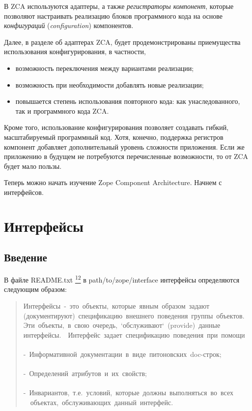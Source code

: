 \documentclass[a4paper,openany,twoside,final]{book}
\providecommand*{\DUfootnotemark}[3]{%
  \raisebox{1em}{\hypertarget{#1}{}}%
  \hyperlink{#2}{\textsuperscript{#3}}%
}
\begin{document}
В ZCA используются адаптеры, а также \emph{регистраторы компонент}, которые
позволяют настраивать реализацию блоков программного кода на
основе \emph{конфигураций} (\emph{configuration}) компонентов.

Далее, в разделе об адаптерах ZCA, будет продемонстрированы
приемущества использования конфигурирования, в частности,

\begin{itemize}

\item возможность переключения между вариантами реализации;

\item возможность при необходимости добавлять новые реализации;

\item повышается степень использования повторного кода: как
унаследованного, так и программного кода ZCA.

\end{itemize}

Кроме того, использование конфигурирования позволяет создавать гибкий,
масштабируемый программный код.  Хотя, конечно, поддержка регистров
компонент добавляет дополнительный уровень сложности приложения.  Если
же приложению в будущем не потребуются перечисленные возможности, то
от ZCA будет мало пользы.

Теперь можно начать изучение Zope Component Architecture. Начнем с
интерфейсов.


\chapter{Интерфейсы%
  \label{id23}%
}


\section{Введение%
  \label{id24}%
}

В файле README.txt\DUfootnotemark{id25}{readmes}{12} в path/to/zope/interface интерфейсы
определяются следующим образом:

\begin{quote}{\ttfamily \raggedright \noindent
Интерфейсы~-~это~объекты,~которые~явным~образом~задают\\
(документируют)~спецификацию~внешнего~поведения~группы~объектов.\\
Эти~объекты,~в~свою~очередь,~`обслуживают`~(provide)~данные\\
интерфейсы.~~Интерфейс~задает~спецификацию~поведения~при~помощи\\
~\\
-~Информативной~документации~в~виде~питоновских~doc-строк;\\
~\\
-~Определений~атрибутов~и~их~свойств;\\
~\\
-~Инвариантов,~т.е.~условий,~которые~должны~выполняться~во~всех\\
~~объектах,~обслуживающих~данный~интерфейс.
}
\end{quote}
\end{document}
